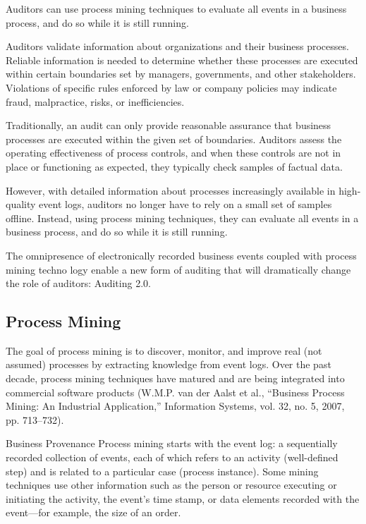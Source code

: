 Auditors can use process mining techniques to evaluate all events in a business process, and do so while it is still running.~\citep{5427384}

Auditors validate information about organizations and their business processes. Reliable information is needed to determine whether these processes are executed within certain boundaries set by managers, governments, and other stakeholders. Violations of specific rules enforced by law or company policies may indicate fraud, malpractice, risks, or inefficiencies.

Traditionally, an audit can only provide reasonable assurance that business processes are executed within the given set of boundaries. Auditors assess the operating effectiveness of process controls, and when these controls are not in place or functioning as expected, they typically check samples of factual data.

However, with detailed information about processes increasingly available in high-quality event logs, auditors no longer have to rely on a small set of samples offline. Instead, using process mining techniques, they can evaluate all events in a business process, and do so while it is still running.

The omnipresence of electronically recorded business events coupled with process mining techno logy enable a new form of auditing that will dramatically change the role of auditors: Auditing 2.0.

\subsection{Process Mining}

The goal of process mining is to discover, monitor, and improve real (not assumed) processes by extracting knowledge from event logs. Over the past decade, process mining techniques have matured and are being integrated into commercial software products (W.M.P. van der Aalst et al., “Business Process Mining: An Industrial Application,” Information Systems, vol. 32, no. 5, 2007, pp. 713–732).

Business Provenance
Process mining starts with the event log: a sequentially recorded collection of events, each of which refers to an activity (well-defined step) and is related to a particular case (process instance). Some mining techniques use other information such as the person or resource executing or initiating the activity, the event's time stamp, or data elements recorded with the event—for example, the size of an order.

